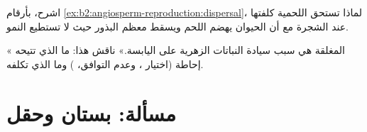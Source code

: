 \begin{exercise}[$\star\star\star$]\label{exo:b2:angiosperm-reproduction:11}
اشرح، بأرقام \cref{ex:b2:angiosperm-reproduction:dispersal}،
لماذا تستحق  اللحمية كلفتها عند الشجرة مع أن
الحيوان يهضم اللحم ويسقط معظم البذور حيث لا تستطيع النمو.
\end{exercise}

\begin{exercise}[$\star\star\star$]\label{exo:b2:angiosperm-reproduction:12}
« المغلقة هي سبب سيادة النباتات الزهرية على اليابسة.» ناقش
هذا: ما الذي تتيحه إحاطة  (اختيار ، وعدم التوافق،
) وما الذي تكلفه.
\end{exercise}

\section{مسألة: بستان وحقل}

